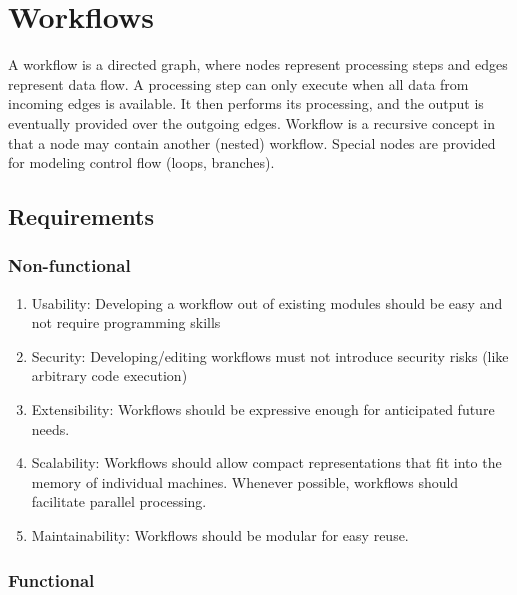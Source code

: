 
\chapter{Workflows}

A workflow is a directed graph, where nodes represent processing steps and edges represent data flow. A processing step can only execute when all data from incoming edges is available. It then performs its processing, and the output is eventually provided over the outgoing edges. Workflow is a recursive concept in that a node may contain another (nested) workflow. Special nodes are provided for modeling control flow (loops, branches).

\section{Requirements}

\subsection{Non-functional}

\begin{enumerate}
	\item \label{enum:NFR:W1} Usability: Developing a workflow out of existing modules should be easy and not require programming skills
	\item \label{enum:NFR:W2} Security: Developing/editing workflows must not introduce security risks (like arbitrary code execution)
	\item \label{enum:NFR:W3} Extensibility: Workflows should be expressive enough for anticipated future needs. 
	\item \label{enum:NFR:W4} Scalability: Workflows should allow compact representations that fit into the memory of individual machines. Whenever possible, workflows should facilitate parallel processing.
	\item \label{enum:NFR:W5} Maintainability: Workflows should be modular for easy reuse.
\end{enumerate}

\subsection{Functional}

